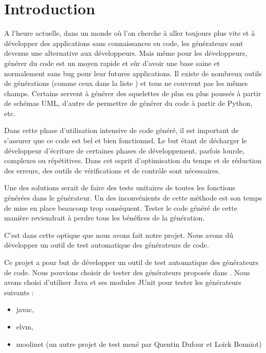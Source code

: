 \chapter*{Introduction}

A l'heure actuelle, dans un monde où l'on cherche à aller toujours plus vite et à développer des applications sans connaissances en code, les générateurs sont devenus une alternative aux développeurs. Mais même pour les développeurs, générer du code est un moyen rapide et sûr d'avoir une base saine et normalement sans bug pour leur futures applications. Il existe de nombreux outils de générations (comme ceux dans la liste \cite{liste_generateurs}) et tous ne couvrent pas les mêmes champs. Certains servent à générer des squelettes de plus en plus poussés à partir de schémas UML, d'autre de permettre de générer du code \jv à partir de Python, etc.

Dans cette phase d'utilisation intensive de code généré, il est important de s'assurer que ce code est bel et bien fonctionnel. Le but étant de décharger le développeur d'écriture de certaines phases de développement, parfois lourde, complexes ou répétitives. Dans cet esprit d'optimisation du temps et de réduction des erreurs, des outils de vérifications et de contrôle sont nécessaires.

Une des solutions serait de faire des tests unitaires de toutes les fonctions générées dans le générateur. Un des inconvénients de cette méthode est son temps de mise en place beaucoup trop conséquent. Tester le code généré de cette manière reviendrait à perdre tous les bénéfices de la génération.

C'est dans cette optique que nous avons fait notre projet. Nous avons dû développer un outil de test automatique des générateurs de code.

\hspace{15pt}


Ce projet a pour but de développer un outil de test automatique des générateurs de code. Nous pouvions choisir de tester des générateurs proposés dans \cite{liste_generateurs}. Nous avons choisi d'utiliser Java et ses modules JUnit pour tester les générateurs suivants :

\begin{itemize}
    \item javac,
    \item elvm,
    \item moolinet (un autre projet de test mené par Quentin Dufour et Loïck Bonniot)
\end{itemize}
